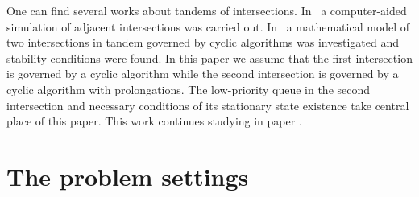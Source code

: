 \documentclass[60x84/16,10pt]{dccn}
\begin{document}
{One can find several works about tandems of intersections. In~\cite{y:l:1985} a computer-aided
simulation of adjacent intersections was carried out. In~\cite{z:2012} a mathematical model of two intersections in tandem governed by cyclic algorithms was investigated and stability conditions were found. In this paper we assume that the first intersection is governed by a cyclic algorithm while the second intersection is governed by a cyclic algorithm with prolongations. The low-priority queue in the second intersection and necessary conditions of its stationary state existence take central place of this paper. This work continues studying in paper \cite{k:z:2016}.

\section{The  problem settings}

}
\end{document}
